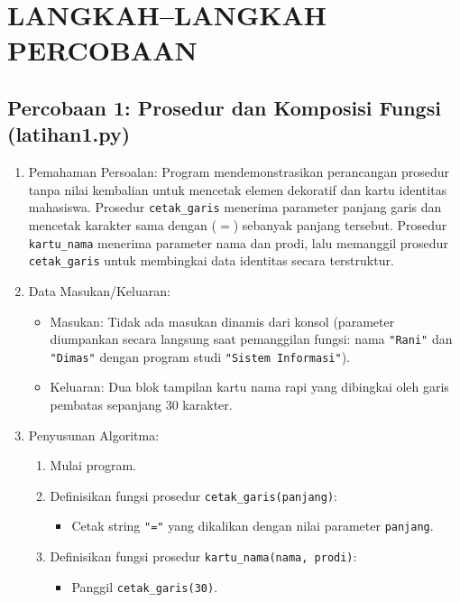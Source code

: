 \documentclass[12pt,a4paper]{article}
\begin{document}
\section{LANGKAH--LANGKAH PERCOBAAN}

\subsection{Percobaan 1: Prosedur dan Komposisi Fungsi (latihan1.py)}
\begin{enumerate}
    \item Pemahaman Persoalan: Program mendemonstrasikan perancangan prosedur tanpa nilai kembalian untuk mencetak elemen dekoratif dan kartu identitas mahasiswa. Prosedur \texttt{cetak\_garis} menerima parameter panjang garis dan mencetak karakter sama dengan ($=$) sebanyak panjang tersebut. Prosedur \texttt{kartu\_nama} menerima parameter nama dan prodi, lalu memanggil prosedur \texttt{cetak\_garis} untuk membingkai data identitas secara terstruktur.
    \item Data Masukan/Keluaran:
    \begin{itemize}
        \item Masukan: Tidak ada masukan dinamis dari konsol (parameter diumpankan secara langsung saat pemanggilan fungsi: nama \texttt{"Rani"} dan \texttt{"Dimas"} dengan program studi \texttt{"Sistem Informasi"}).
        \item Keluaran: Dua blok tampilan kartu nama rapi yang dibingkai oleh garis pembatas sepanjang 30 karakter.
    \end{itemize}
    \item Penyusunan Algoritma:
    \begin{enumerate}[label=\alph*.]
        \item Mulai program.
        \item Definisikan fungsi prosedur \texttt{cetak\_garis(panjang)}:
        \begin{itemize}
            \item Cetak string \texttt{"="} yang dikalikan dengan nilai parameter \texttt{panjang}.
        \end{itemize}
        \item Definisikan fungsi prosedur \texttt{kartu\_nama(nama, prodi)}:
        \begin{itemize}
            \item Panggil \texttt{cetak\_garis(30)}.

\end{itemize}
\end{enumerate}
\end{enumerate}
\end{document}
